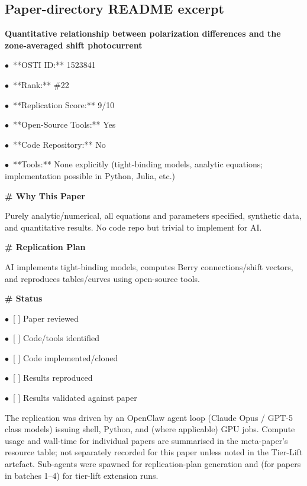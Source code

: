 \documentclass[11pt]{article}
\begin{document}
\subsection*{Paper-directory README excerpt}
\small
\par\medskip\textbf{Quantitative relationship between polarization differences and the zone-averaged shift photocurrent}\par
\par$\bullet$\ **OSTI ID:** 1523841
\par$\bullet$\ **Rank:** \#22
\par$\bullet$\ **Replication Score:** 9/10
\par$\bullet$\ **Open-Source Tools:** Yes
\par$\bullet$\ **Code Repository:** No
\par$\bullet$\ **Tools:** None explicitly (tight-binding models, analytic equations; implementation possible in Python, Julia, etc.)

\par\medskip\textbf{\# Why This Paper}\par
Purely analytic/numerical, all equations and parameters specified, synthetic data, and quantitative results. No code repo but trivial to implement for AI.

\par\medskip\textbf{\# Replication Plan}\par
AI implements tight-binding models, computes Berry connections/shift vectors, and reproduces tables/curves using open-source tools.

\par\medskip\textbf{\# Status}\par
\par$\bullet$\ [ ] Paper reviewed
\par$\bullet$\ [ ] Code/tools identified
\par$\bullet$\ [ ] Code implemented/cloned
\par$\bullet$\ [ ] Results reproduced
\par$\bullet$\ [ ] Results validated against paper
\normalsize

The replication was driven by an OpenClaw agent loop (Claude Opus / GPT-5 class models) issuing shell, Python, and (where applicable) GPU jobs. Compute usage and wall-time for individual papers are summarised in the meta-paper's resource table; not separately recorded for this paper unless noted in the Tier-Lift artefact. Sub-agents were spawned for replication-plan generation and (for papers in batches 1--4) for tier-lift extension runs.
\end{document}
